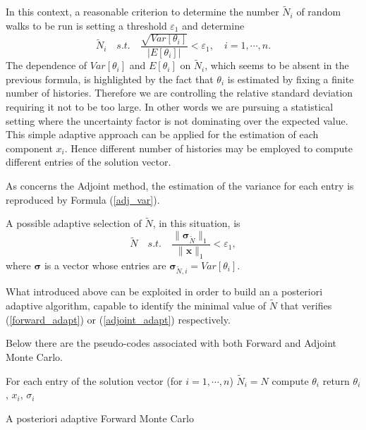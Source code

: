 \documentclass[a4paper,10pt]{article}
\begin{document}
In this context, a reasonable criterion to determine the number $\tilde{N}_i$ 
of random walks to be run is setting a threshold $\varepsilon_1$ and determine
\begin{equation}
\tilde{N}_i \quad s.t.\quad \frac{\sqrt{Var[\theta_i]}}{\lvert 
E[\theta_i]\rvert}<\varepsilon_1, \quad i=1,\cdots,n.
\label{forward_adapt}
\end{equation}
The dependence of $Var[\theta_i]$ and $E[\theta_i]$ on $\tilde{N}_i$, which 
seems 
to be absent in the previous formula, is highlighted by the fact that 
$\theta_i$ 
is estimated by fixing a finite number of histories.
Therefore we are controlling the relative standard deviation requiring it not 
to be too large. In other words we are pursuing a statistical setting where the 
uncertainty factor is not dominating over the expected value.
This simple adaptive approach can be applied for the estimation of each 
component $x_i$. Hence different number of histories may be employed to 
compute different entries of the solution vector. \newline


As concerns the Adjoint method, the estimation of the variance for each entry 
is reproduced by Formula (\ref{adj_var}).

A possible adaptive selection of $\tilde{N}$, in this situation, is 
\begin{equation}
\tilde{N} \quad s.t. \quad \frac{\lVert 
\boldsymbol{\sigma}_{\tilde{N}}\rVert_1}{\lVert 
\mathbf{x}\rVert_1}<\varepsilon_1,
\label{adjoint_adapt}
\end{equation}
where $\boldsymbol{\sigma}$ is a vector whose entries are 
$\boldsymbol{\sigma}_{\tilde{N},i}=Var[\theta_i]$.

What introduced above can be exploited in order to build 
an a posteriori adaptive algorithm, capable to identify the minimal value of 
$\tilde{N}$ that verifies (\ref{forward_adapt}) or (\ref{adjoint_adapt}) 
respectively.

Below there are the pseudo-codes associated with both Forward and Adjoint Monte 
Carlo. 

\begin{algorithm}[H]
 For each entry of the solution vector (for $i=1,\cdots,n$) \;
 $\tilde{N}_i=N$\;
 compute $\theta_i$\;
 return $\theta_i$, $x_i$, $\sigma_i$\; 
 \caption{A posteriori adaptive Forward Monte Carlo}
\end{algorithm}
\end{document}
